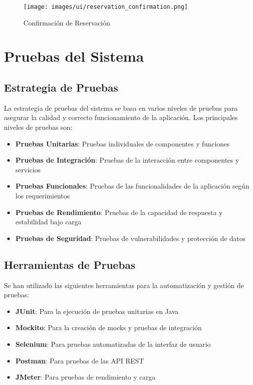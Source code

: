 \documentclass[12pt,a4paper]{article}
\begin{document}
\begin{figure}[H]
    \centering
    \texttt{[image: images/ui/reservation\_confirmation.png]}
    \caption{Confirmación de Reservación}
    \label{fig:confirmacion_reservacion}
\end{figure}

\section{Pruebas del Sistema}

\subsection{Estrategia de Pruebas}

La estrategia de pruebas del sistema se basa en varios niveles de pruebas para asegurar la calidad y correcto funcionamiento de la aplicación. Los principales niveles de pruebas son:

\begin{itemize}
    \item \textbf{Pruebas Unitarias}: Pruebas individuales de componentes y funciones
    \item \textbf{Pruebas de Integración}: Pruebas de la interacción entre componentes y servicios
    \item \textbf{Pruebas Funcionales}: Pruebas de las funcionalidades de la aplicación según los requerimientos
    \item \textbf{Pruebas de Rendimiento}: Pruebas de la capacidad de respuesta y estabilidad bajo carga
    \item \textbf{Pruebas de Seguridad}: Pruebas de vulnerabilidades y protección de datos
\end{itemize}

\subsection{Herramientas de Pruebas}

Se han utilizado las siguientes herramientas para la automatización y gestión de pruebas:

\begin{itemize}
    \item \textbf{JUnit}: Para la ejecución de pruebas unitarias en Java
    \item \textbf{Mockito}: Para la creación de mocks y pruebas de integración
    \item \textbf{Selenium}: Para pruebas automatizadas de la interfaz de usuario
    \item \textbf{Postman}: Para pruebas de las API REST
    \item \textbf{JMeter}: Para pruebas de rendimiento y carga
\end{itemize}
\end{document}
